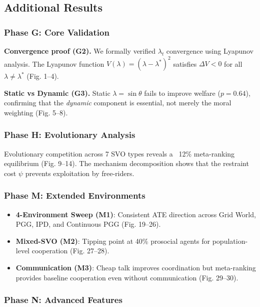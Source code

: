 \documentclass{article}
\begin{document}
\subsection{Additional Results}

\subsubsection{Phase G: Core Validation}

\noindent\textbf{Convergence proof (G2).} We formally verified $\lambda_t$ convergence using Lyapunov analysis. The Lyapunov function $V(\lambda) = (\lambda - \lambda^*)^2$ satisfies $\Delta V < 0$ for all $\lambda \neq \lambda^*$ (Fig. 1--4).

\noindent\textbf{Static vs Dynamic (G3).} Static $\lambda = \sin\theta$ fails to improve welfare ($p = 0.64$), confirming that the \textit{dynamic} component is essential, not merely the moral weighting (Fig. 5--8).

\subsubsection{Phase H: Evolutionary Analysis}

Evolutionary competition across 7 SVO types reveals a ~12\% meta-ranking equilibrium (Fig. 9--14). The mechanism decomposition shows that the restraint cost $\psi$ prevents exploitation by free-riders.

\subsubsection{Phase M: Extended Environments}

\begin{itemize}
    \item \textbf{4-Environment Sweep (M1)}: Consistent ATE direction across Grid World, PGG, IPD, and Continuous PGG (Fig. 19--26).
    \item \textbf{Mixed-SVO (M2)}: Tipping point at 40\% prosocial agents for population-level cooperation (Fig. 27--28).
    \item \textbf{Communication (M3)}: Cheap talk improves coordination but meta-ranking provides baseline cooperation even without communication (Fig. 29--30).
\end{itemize}

\subsubsection{Phase N: Advanced Features}
\end{document}
